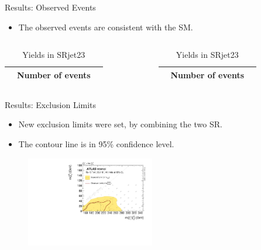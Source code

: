 \documentclass[mathserif,serif]{beamer}
\begin{document}
\begin{frame}{Results: Observed Events}
\begin{itemize}
\item The observed events are consistent with the SM.
\end{itemize}
\begin{table}[htbp]
\centering

\begin{columns}

\begin{column}{0.5\textwidth}
\begin{tabular}{|c|c|c|}
\hline
& Number of events \\
\hline

\end{tabular}
\caption{Yields in SRjet1}
\end{column}

\begin{column}{0.5\textwidth}
\begin{tabular}{|c|c|c|}
\hline
& Number of events \\
\hline

\end{tabular}
\caption{Yields in SRjet23}
\end{column}

\end{columns}
\end{table}
\end{frame}

\begin{frame}{Results: Exclusion Limits}
\begin{itemize}
\item New exclusion limits were set, by combining the two SR.
\item The contour line is in 95\% confidence level.
\end{itemize}
\begin{figure}
\centering
\includegraphics[width=0.5\textwidth]{data/plot/HistFitterResults/contourPlotterWhSS_upperLimit.pdf}
\end{figure}
\end{frame}
\end{document}
